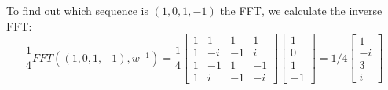 \documentclass[twoside]{homework}
\begin{document}
\begin{enumerate}
	To find out which sequence is $(1,0,1,-1)$ the FFT, we calculate the inverse FFT:
	\[\frac{1}{4}FFT((1,0,1,-1), w^{-1}) = \frac{1}{4}\begin{bmatrix}
		1 & 1 & 1 & 1 \\
		1 & -i & -1 & i \\
		1 & -1 & 1 & -1 \\
		1 & i & -1 & -i
	\end{bmatrix} \begin{bmatrix}
		1 \\ 0\\ 1\\ -1
	\end{bmatrix}
	= 1/4\begin{bmatrix}
		1 \\ -i \\ 3 \\ i
	\end{bmatrix}\]
\end{enumerate}
\end{document}
